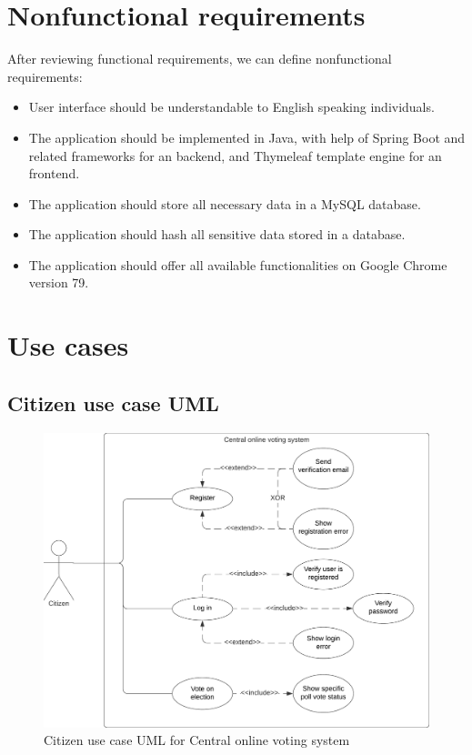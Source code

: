 \documentclass[a4paper,twoside,12pt]{book}
\newcommand{\Title}{Central online voting system}
\begin{document}
  \section{Nonfunctional requirements}
    After reviewing functional requirements, we can define nonfunctional requirements:
    \begin{itemize}
      \item User interface should be understandable to English speaking individuals.
      \item The application should be implemented in Java, with help of Spring Boot and related frameworks for an backend, 
      and Thymeleaf template engine for an frontend.
      \item The application should store all necessary data in a MySQL database.
      \item The application should hash all sensitive data stored in a database.
      \item The application should offer all available functionalities on Google Chrome version 79.
    \end{itemize}
  \pagebreak

  \section{Use cases}
    \subsection{Citizen use case UML}
    \begin{figure}[h]
      \includegraphics[width=\linewidth]{citizen_uml.png}
      \caption{Citizen use case UML for \Title}
      \label{fig:citizen_uml}
    \end{figure}
\end{document}
